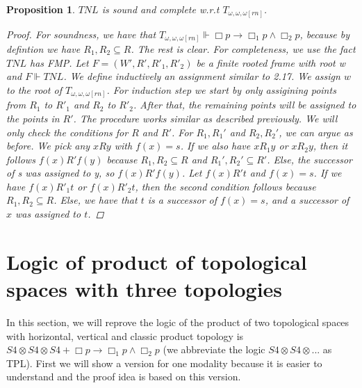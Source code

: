 \documentclass[12pt, a4paper]{scrartcl}
\newtheorem{proposition}[definition]{Proposition}
\begin{document}
\begin{proposition}
    $\mathit{TNL}$ is sound and complete w.r.t $T_{\omega,\omega,\omega[rn]}$.

    \begin{proof}
    For soundness, we have that $T_{\omega,\omega,\omega[rn]} \Vdash \Box p \rightarrow \Box_1 p \land \Box_2p$, because by defintion we have $R_1,R_2 \subseteq R$. The rest is clear.
    For completeness, we use the fact $\mathit{TNL}$ has FMP. Let $F = (W',R', R'_1, R'_2)$ be a finite rooted frame with root w and $F \Vdash TNL$. We define inductively an
    assignment similar to 2.17. We assign $w$ to the root of $T_{\omega,\omega,\omega[rn]}$. For induction step we start by only assigining points from $R_1$ to $R'_1$ and $R_2$ to $R'_2$. After that, the remaining points will be assigned to the points in $R'$.
    The procedure works similar as described previously. \newline
    We will only check the conditions for $R$ and $R'$. For $R_1, R_1'$ and $R_2, R_2'$, we can argue as before. We pick any $xRy$ with $f(x) = s$. 
    If we also have $xR_1y$ or $xR_2y$, then it follows $f(x)R' f(y)$ because $R_1, R_2 \subseteq R$ and $R_1', R_2' \subseteq R'$. Else, the successor of s was assigned to y, so $f(x)R'f(y)$. \newline
    Let $f(x)R't$ and $f(x) = s$. If we have $f(x) R'_1 t$ or $f(x) R'_2 t$, then the second condition follows because $R_1,R_2 \subseteq R$.
    Else, we have that $t$ is a successor of $f(x) = s$, and a successor of $x$ was assigned to $t$.
    \end{proof}
        
\end{proposition}




\clearpage

\section{Logic of product of topological spaces with three topologies}
In this section, we will reprove the logic of the product of two topological spaces with horizontal, vertical and classic product topology is 
$S4 \otimes S4 \otimes S4 + \Box p \rightarrow \Box_1 p \land \Box_2 p$ (we abbreviate the logic $S4 \otimes S4 \otimes ...$ as TPL). First we will show a version for one modality
because it is easier to understand and the proof idea is based on this version.
\end{document}
